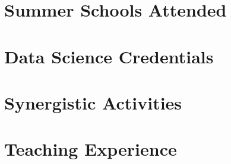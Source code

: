 \documentclass[margin,line]{resume}
\begin{document}
\begin{resume}
    

\vspace{-2mm}    
    \section{\mysidestyle Summer Schools Attended}

    

\vspace{-2mm}    
    \section{\mysidestyle Data Science Credentials}

    





    
    \section{\mysidestyle Synergistic Activities}

    



    \newpage
    \section{\mysidestyle Teaching Experience}
    
     
    \newpage


\end{resume}
\end{document}
